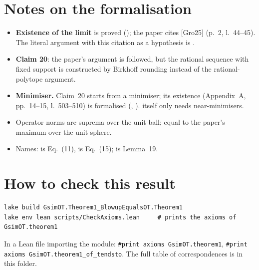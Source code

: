 \section{Notes on the formalisation}
\begin{itemize}
\item \textbf{Existence of the limit} is proved (); the paper cites [Gro25] (p.~2, l.~44--45).
  The literal argument with this citation as a hypothesis is .
\item \textbf{Claim 20}: the paper's argument is followed, but the
  rational sequence with fixed support is constructed by Birkhoff rounding instead of the rational-polytope argument.
\item \textbf{Minimiser.} Claim~20 starts from a minimiser; its existence (Appendix~A, pp.~14--15, l.~503--510) is
  formalised (, ).  itself
  only needs near-minimisers.
\item Operator norms are suprema over the unit ball; equal to the paper's maximum over the unit sphere.
\item Names:  is Eq.~(11),  is Eq.~(15);  is Lemma~19.
\end{itemize}

\section{How to check this result}
\begin{verbatim}
lake build GsimOT.Theorem1_BlowupEqualsOT.Theorem1
lake env lean scripts/CheckAxioms.lean     # prints the axioms of GsimOT.theorem1
\end{verbatim}
In a Lean file importing the module: \texttt{\#print axioms GsimOT.theorem1},
\texttt{\#print axioms GsimOT.theorem1\_of\_tendsto}. The full table of correspondences is
 in this folder.

